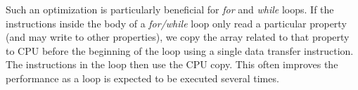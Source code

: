 Such an optimization is particularly beneficial for \textit{for} and \textit{while} loops.
If the instructions inside the body of a \textit{for/while} loop only read a particular property (and may write to other properties), we copy the array related to that property to CPU before the beginning of the loop using a single data transfer instruction. 
The instructions in the loop then use the CPU copy.
This often improves the performance as a loop is expected to be executed several times.


